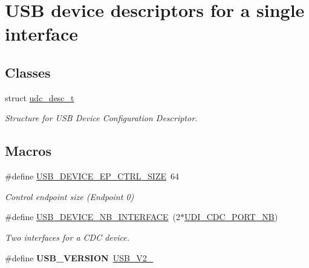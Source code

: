 \hypertarget{group__udi__cdc__group__single__desc}{\section{U\-S\-B device descriptors for a single interface}
\label{group__udi__cdc__group__single__desc}
}
\subsection*{Classes}
\begin{DoxyCompactItemize}
\item 
struct \hyperlink{structudc__desc__t}{udc\-\_\-desc\-\_\-t}
\begin{DoxyCompactList}\small\item\em Structure for U\-S\-B Device Configuration Descriptor. \end{DoxyCompactList}\end{DoxyCompactItemize}
\subsection*{Macros}
\begin{DoxyCompactItemize}
\item 
\hypertarget{group__udi__cdc__group__single__desc_ga67d99007f1886e516e6705e19c38b541}{\#define \hyperlink{group__udi__cdc__group__single__desc_ga67d99007f1886e516e6705e19c38b541}{U\-S\-B\-\_\-\-D\-E\-V\-I\-C\-E\-\_\-\-E\-P\-\_\-\-C\-T\-R\-L\-\_\-\-S\-I\-Z\-E}~64}\label{group__udi__cdc__group__single__desc_ga67d99007f1886e516e6705e19c38b541}

\begin{DoxyCompactList}\small\item\em Control endpoint size (Endpoint 0) \end{DoxyCompactList}\item 
\hypertarget{group__udi__cdc__group__single__desc_gad079423a5116ebac5e26628447e0d0c1}{\#define \hyperlink{group__udi__cdc__group__single__desc_gad079423a5116ebac5e26628447e0d0c1}{U\-S\-B\-\_\-\-D\-E\-V\-I\-C\-E\-\_\-\-N\-B\-\_\-\-I\-N\-T\-E\-R\-F\-A\-C\-E}~(2$\ast$\hyperlink{conf__usb_8h_aecfe45ce8d46d80442a7d66111ac7c4e}{U\-D\-I\-\_\-\-C\-D\-C\-\_\-\-P\-O\-R\-T\-\_\-\-N\-B})}\label{group__udi__cdc__group__single__desc_gad079423a5116ebac5e26628447e0d0c1}

\begin{DoxyCompactList}\small\item\em Two interfaces for a C\-D\-C device. \end{DoxyCompactList}\item 
\hypertarget{group__udi__cdc__group__single__desc_ga6bc3df68ee1deeb69cebfdfef7f8b685}{\#define {\bfseries U\-S\-B\-\_\-\-V\-E\-R\-S\-I\-O\-N}~\hyperlink{group__usb__protocol__group_ga9bccec980a4f41a481b389b4f0c9c690}{U\-S\-B\-\_\-\-V2\-\_}}\label{group__udi__cdc__group__single__desc_ga6bc3df68ee1deeb69cebfdfef7f8b685}

\end{DoxyCompactItemize}
